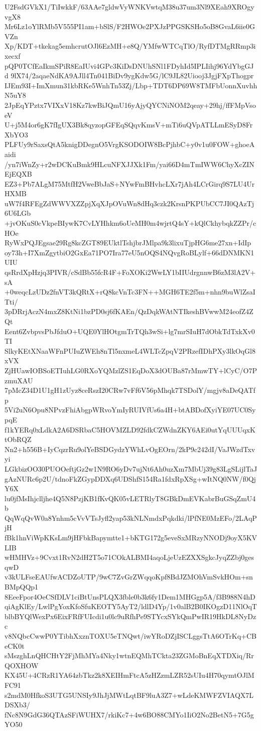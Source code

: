 U2FsdGVkX1/TiIwkkF/63AAe7gldwVyWNKVwtqM38u37um3Nl9XEah9XROgyvgX8
Mr6Lz1oYlRMb5V555PI1am+bSlS/F2HWOe2PXJzPPGSKSHo5oB8GvaL6iie0GVZn
Xp/KDT+tkekag5emhcrutOJl6EzMH+e8Q/YMfwWTCqTlO/RyfDTMgRRmp3ixecxf
pQP0TCfEaIkmSPiR8EaIUvi4GPc3KiDsDNUhSNl1FDyhId5IPLIihj96YdYbgGJd
9lX74/2aqaeNdKA9AJll4Tn041BiDv9ygKdw5G/lC9JL82Uiooj3JgjFXpThogpr
IJEm93I+ImXmun31kbRKe5WnhTn53Zj/Lbp+TDT6DP69W8TMFbUonnXuvhhN5uY8
2JpEqYPztx7VIXxV18Kz7kwBiJQmU16yAjyQYCNiNOM2qeay+29hj/ffFMpVsoeV
U+j5M4or6gK7fIgUX3Bk8qyzopGFEqSQqvKmsV+mTi6uQVpATLLmESyD8FrXbYO3
PLFUy9rSaxsQtA5knigDDegnO5VrgKSODOIW8BcPjhbC+y0v1u0FOW+ghoeAaidi
/yn7iWnZy+r2wDCKuBmk9HLcuNFXJJXk1Fm/yai66D4mTmIWW6ChyXcZINEjEQXB
EZ3+Pb7ALgM75MtfH2VweBbJaS+NYwFmBHvhcLXr7jAh4LCrGirq9S7LU4UrHXMB
uW7f4RFEgZdWWVXZZpjXqXJpOVuWn8dHq3czk2KrsnPKPUbCC7JI0QAzTj6U6LGb
+jvOKuS0cVkpeBIywK7CvLYHhkm6oUeMH0m4wjrtQ4sY+kQlCkhybqkZZPr/cHOe
RyWxPQJEgsae29Rg8kcZGT89EUktlTshjbrJMlpa9k3lixuTjpHG6me27xn+IdIp
oy73h+I7XmZgytbiO2GxEa71PO7Ira77eU5nOQS4NQvgRoBLylf+66dDNMKN1UIU
qsRrdXpHzjq3PIVR/cSdBb55fcR4F+FoXOKi2WwLY1bIIUdrgnnwB6zM3lA2V+sA
+0weqcLzUDz2fnVT3kQRtX+rQ8kcVnTc3FN++MGH6TE2f5m+nhn9buWlZsaITti/
3pDRrjAczN4mxZ8KtNi1bzPD0sj6fKAEn/QzDqkWAtNTIkeshBVwwM24eofZ4ZQt
Eent6ZvbpvsPbJfduO+UQE0YlHOtgmTrTQh3wSi+lg7mrSIuH7dObkTdTxkXv0TI
SlkyKEtXNaaWFnPUIuZWEh8nTl5nxmeL4WLTcZpqV2PRzefIDhPXy3lkOqGl8xVX
ZjHUawIOBSoETIuhLG0RXoYQMzlZS1EqDoX3dOUBa87rMmwTY+lCyC/O7PzmuXAU
7pMcZ34D1U1gH1zUyz8ceRszI20CRw7vFf6V56pMhqk7TSDolY/mgjv8aDeQATfp
5Vi2uN6Opu8NPvzFhiAbgpWRvoYmIyRUIVfUs6a4H+btABDofXyiYE07UC0SypqE
f1kYERq0xLdkA2A6DSRbaC5HOVMZLD92fdkCZWdnZKY6AEi0utYqUUUqxKtObRQZ
Nn2+h556B+IyCqzrRu9olYeBSDGydzYWhLvOgEOrn/2kP9c242dI/VaJWzdTxvyi
LGkbizOO30PUOOeftjGz2w1N9RO6yDv7ujNt6Ah0uzXm7MbUj39g83LgSLijlTaJ
gAzNURc6p2U/tdnoFkZGypDDXq6UDShfS154Ra1fdxRpXSg+wItNQ0NW/f0QjY6X
lu0jfMsIhjclljhe4Q5N8PzjKB1fKvQK05vLETRlyT8GBkDmEVKabrBuGSqZmU4b
QqWqQvW0a8Ynhm5cVvVTsJyfl2yap53kNLNmdxPqkdki/lPfNE0MzEFo/2LAqPjH
fBk1hnViWpKKsLm9jHFbkBapymtte1+bKTG172g5eveSxMRzyNNODj9oyX5KVLIB
wHMHVz+9Cvxt1RvN2dH2T5o71COkALBMI4aqoLjeUzEZXXSgkcJyqZZbj0gesqwD
v3kULFseEAUfwACDZoUTP/9wC7ZvGrZWqqoKpf8BdJZMOhVmSvkHOm+snBMpQQp1
8EeeFpor4OeCSfDLV1ciBtUnsPLQX3fble0b3k6fy1Dem1MHGgp5A/f3B988N4hD
qiAgKlEy/LwlPgYoxKfoSfuKEOTY5AyT2/ldlD4Yp/1v0alB2B0IKOgzD11NlOqT
blbBYQlWexPx6EixFRfFUIcdi1u0lc9uRfhPe9STYcxSYkQmPwIR19HkDL8NyDzc
v8NQbcCwwP0YTibhXxznTOXU5eTNQwt/iwYRoDZjISCLggsTtA6OTrKq+CBeCK0t
sMszghLnQHCHtY2FjMhMYa4Nky1wtnEQMhTCkta23ZGMoBnEqXTDXiq/RrQOXHOW
KX45U+4CRzR1YA64zbTkz2k8XEIHmFtcA5zHZzmLZR52sUIu4H70qymtOJlMFC91
s2mdM0HfkoS3UTG5UNSIy9JhJjMWtLqtBF9luA3Z7+wLdeKMWFZVIAQX7LDSXb3/
fNc8N9GdG36QTAzSFiWUHX7/rkiKc7+4w6BO88CMYo1IiO2No2BetN5+7G5gYO50
